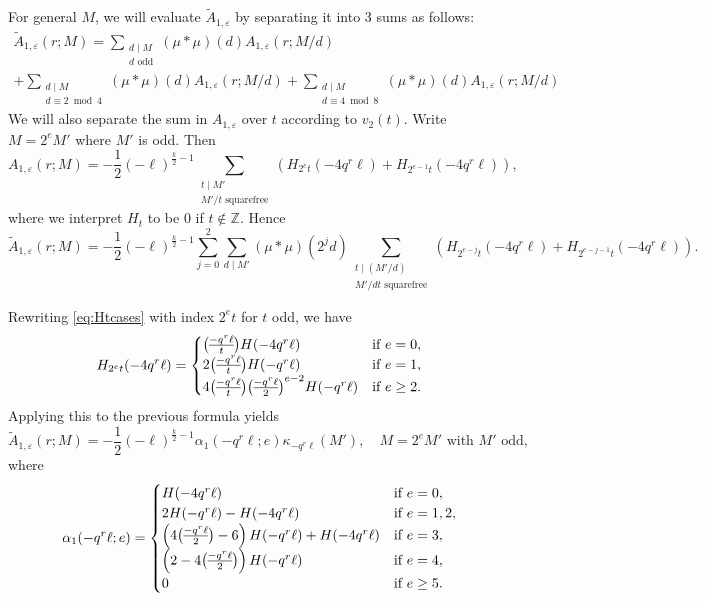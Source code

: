 \documentclass[11pt]{amsart}
\newcommand{\Z}{\mathbb Z}
\newcommand{\eps}{\varepsilon}
\renewcommand{\mod}{\bmod}
\newcommand{\leg}{\overwithdelims ()}
\numberwithin{lem}{section}
\theoremstyle{remark}
\theoremstyle{definition}
\numberwithin{equation}{section}
\begin{document}
For general $M$, we will evaluate $\tilde A_{1,\eps}$ by separating it into 3 sums as follows:
\begin{multline*}
 \tilde A_{1,\eps}(r; M) = \sum_{\substack{d \mid M \\ d \text{ odd}}} (\mu * \mu)(d) A_{1,\eps}(r;M/d) \\
+ \sum_{\substack{d \mid M \\ d \equiv 2 \mod 4}} (\mu * \mu)(d) A_{1,\eps}(r;M/d) 
+ \sum_{\substack{d \mid M \\ d \equiv 4 \mod 8}} (\mu * \mu)(d) A_{1,\eps}(r;M/d) 
\end{multline*}
We will also separate the sum in $A_{1,\eps}$ over $t$ according to $v_2(t)$.  Write $M = 2^e M'$ where $M'$ is odd.  Then
\[ A_{1,\eps}(r; M) = - \frac 12 (-\ell)^{\frac k2 - 1} \sum_{\substack{t \mid M' \\ M'/t \text{ squarefree}}} \left( H_{2^{e}t}(-4 q^r \ell)  + H_{2^{e-1}t}(-4 q^r \ell) \right), \]
where we interpret $H_t$ to be $0$ if $t \not \in \Z$.
Hence
\[  \tilde A_{1,\eps}(r; M) = - \frac 12 (-\ell)^{\frac k2 - 1} 
\sum_{j=0}^2 \sum_{d \mid M'} (\mu * \mu)(2^j d) 
\sum_{\substack{t \mid (M'/d) \\ M'/dt \text{ squarefree}}} \left( H_{2^{e-j}t}(-4 q^r \ell)  + H_{2^{e-j-1}t}(-4 q^r \ell) \right). \]

Rewriting \eqref{eq:Htcases} with index $2^e t$ for $t$ odd, we have
\begin{equation*}
 H_{2^e t}(-4 q^r \ell) = 
\begin{cases}
{ - q^r \ell \leg t} H(-4 q^r \ell) & \text{if }e = 0, \\
2{ - q^r \ell \leg t} H(-q^r \ell) & \text{if }e = 1, \\
4{ - q^r \ell \leg t} { - q^r \ell \leg 2}^{e-2} H(-q^r \ell) & \text{if }e \ge 2.
\end{cases} 
\end{equation*}
Applying this to the previous formula yields
\begin{equation} \label{eq:AA1-lsmall}
\tilde A_{1,\eps}(r; M) = - \frac 12 (-\ell)^{\frac k2 - 1} \alpha_1(-q^r \ell; e) 
\kappa_{-q^r \ell}(M'), \quad M = 2^e M' \text{ with } M' \text{ odd},
\end{equation}
where
\[ \alpha_1(-q^r\ell; e) =
\begin{cases}
H(-4q^r \ell) & \text{if }e = 0, \\
2H(-q^r \ell) - H(-4 q^r \ell) & \text{if }e = 1, 2, \\
\left( 4 {-q^r \ell \leg 2} - 6 \right) H(-q^r \ell) + H(-4 q^r \ell) & \text{if }e = 3, \\
\left( 2 - 4 {-q^r \ell \leg 2} \right) H(-q^r \ell) & \text{if }e = 4, \\
0 & \text{if }e \ge 5.
\end{cases} \]
\end{document}
